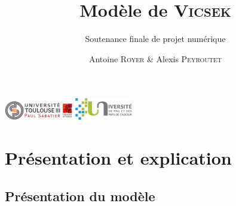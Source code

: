 \documentclass[aspectratio=43, a4paper, 12pt]{beamer}
\title{Modèle de \textsc{Vicsek}}
\subtitle{Soutenance finale de projet numérique}
\author{Antoine \textsc{Royer} \& Alexis \textsc{Peyroutet}}
\institute{L3 PCAME – Tarbes}
\date{}
\begin{document}
	\begin{frame}
		\titlepage
		\includegraphics[width=3cm]{images/ut3.png} \hfill \includegraphics[width=2.5cm]{images/uppa.png}
	\end{frame}
	
\section{Présentation et explication}
\subsection{Présentation du modèle}
\end{document}
